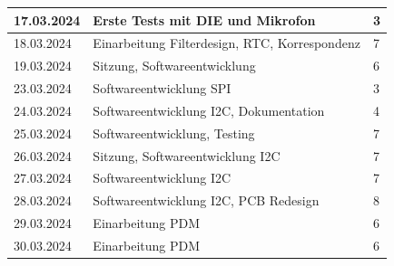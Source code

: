 \documentclass[12pt]{article}
\begin{document}
\begin{table}[H]
\begin{tabular}{|l|p{}|l|}
			17.03.2024 & Erste Tests mit DIE und Mikrofon & 3 \\ \hline
			18.03.2024 & Einarbeitung Filterdesign, RTC, Korrespondenz & 7 \\ \hline
			19.03.2024 & Sitzung, Softwareentwicklung & 6 \\ \hline
			23.03.2024 & Softwareentwicklung SPI & 3 \\ \hline
			24.03.2024 & Softwareentwicklung I2C, Dokumentation & 4 \\ \hline
			25.03.2024 & Softwareentwicklung, Testing & 7 \\ \hline
			26.03.2024 & Sitzung, Softwareentwicklung I2C & 7 \\ \hline
			27.03.2024 & Softwareentwicklung I2C & 7 \\ \hline
			28.03.2024 & Softwareentwicklung I2C, PCB Redesign & 8 \\ \hline
			29.03.2024 & Einarbeitung PDM & 6 \\ \hline
			30.03.2024 & Einarbeitung PDM & 6 \\ \hline
		\end{tabular}
	\end{table}
\end{document}
